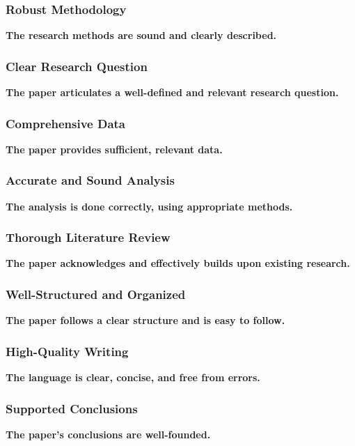 \documentclass[handout]{beamer}
\begin{document}
\begin{frame}[plain]
\centering
\frametitle{Robust Methodology}
\begin{framed}
\Large\textbf{The research methods are sound and clearly described.}
\end{framed}
\end{frame}
\begin{frame}[plain]
\centering
\frametitle{Clear Research Question}
\begin{framed}
\Large\textbf{The paper articulates a well-defined and relevant research question.}
\end{framed}
\end{frame}
\begin{frame}[plain]
\centering
\frametitle{Comprehensive Data}
\begin{framed}
\Large\textbf{The paper provides sufficient, relevant data.}
\end{framed}
\end{frame}
\begin{frame}[plain]
\centering
\frametitle{Accurate and Sound Analysis}
\begin{framed}
\Large\textbf{The analysis is done correctly, using appropriate methods.}
\end{framed}
\end{frame}
\begin{frame}[plain]
\centering
\frametitle{Thorough Literature Review}
\begin{framed}
\Large\textbf{The paper acknowledges and effectively builds upon existing research.}
\end{framed}
\end{frame}
\begin{frame}[plain]
\centering
\frametitle{Well-Structured and Organized}
\begin{framed}
\Large\textbf{The paper follows a clear structure and is easy to follow.}
\end{framed}
\end{frame}
\begin{frame}[plain]
\centering
\frametitle{High-Quality Writing}
\begin{framed}
\Large\textbf{The language is clear, concise, and free from errors.}
\end{framed}
\end{frame}
\begin{frame}[plain]
\centering
\frametitle{Supported Conclusions}
\begin{framed}
\Large\textbf{The paper's conclusions are well-founded.}
\end{framed}
\end{frame}
\end{document}
